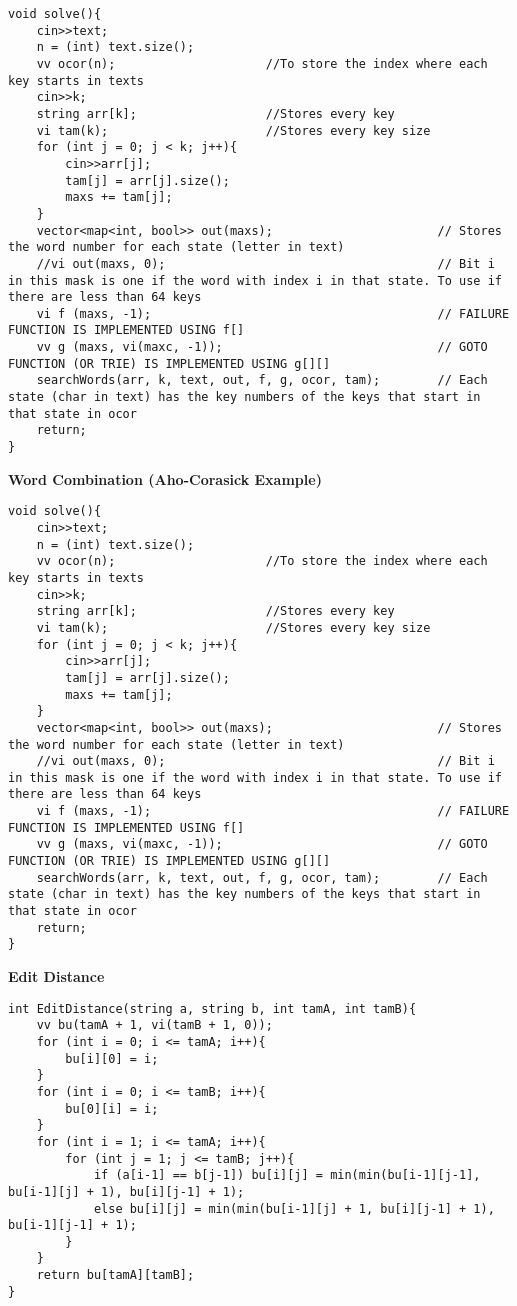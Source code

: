 \documentclass{article}
\begin{document}
\begin{multicols}{2}
\begin{lstlisting}
void solve(){
	cin>>text;
	n = (int) text.size();
	vv ocor(n);                     //To store the index where each key starts in texts
	cin>>k;
	string arr[k];                  //Stores every key
	vi tam(k);                      //Stores every key size
	for (int j = 0; j < k; j++){
		cin>>arr[j];
		tam[j] = arr[j].size();
		maxs += tam[j];
	}
	vector<map<int, bool>> out(maxs);                       // Stores the word number for each state (letter in text)
	//vi out(maxs, 0);                                      // Bit i in this mask is one if the word with index i in that state. To use if there are less than 64 keys
	vi f (maxs, -1);                                        // FAILURE FUNCTION IS IMPLEMENTED USING f[]
	vv g (maxs, vi(maxc, -1));                              // GOTO FUNCTION (OR TRIE) IS IMPLEMENTED USING g[][]
	searchWords(arr, k, text, out, f, g, ocor, tam);        // Each state (char in text) has the key numbers of the keys that start in that state in ocor  
	return;
}	
\end{lstlisting}

\large
\huge\textbf{Word Combination (Aho-Corasick Example)}
\large
\begin{lstlisting}
void solve(){
	cin>>text;
	n = (int) text.size();
	vv ocor(n);                     //To store the index where each key starts in texts
	cin>>k;
	string arr[k];                  //Stores every key
	vi tam(k);                      //Stores every key size
	for (int j = 0; j < k; j++){
		cin>>arr[j];
		tam[j] = arr[j].size();
		maxs += tam[j];
	}
	vector<map<int, bool>> out(maxs);                       // Stores the word number for each state (letter in text)
	//vi out(maxs, 0);                                      // Bit i in this mask is one if the word with index i in that state. To use if there are less than 64 keys
	vi f (maxs, -1);                                        // FAILURE FUNCTION IS IMPLEMENTED USING f[]
	vv g (maxs, vi(maxc, -1));                              // GOTO FUNCTION (OR TRIE) IS IMPLEMENTED USING g[][]
	searchWords(arr, k, text, out, f, g, ocor, tam);        // Each state (char in text) has the key numbers of the keys that start in that state in ocor  
	return;
}
\end{lstlisting}


\large
\huge\textbf{Edit Distance}
\large
\begin{lstlisting}
int EditDistance(string a, string b, int tamA, int tamB){
	vv bu(tamA + 1, vi(tamB + 1, 0));
	for (int i = 0; i <= tamA; i++){
		bu[i][0] = i;
	}
	for (int i = 0; i <= tamB; i++){
		bu[0][i] = i;
	}
	for (int i = 1; i <= tamA; i++){
		for (int j = 1; j <= tamB; j++){
			if (a[i-1] == b[j-1]) bu[i][j] = min(min(bu[i-1][j-1], bu[i-1][j] + 1), bu[i][j-1] + 1);
			else bu[i][j] = min(min(bu[i-1][j] + 1, bu[i][j-1] + 1), bu[i-1][j-1] + 1);
		}
	}
	return bu[tamA][tamB];
}	
\end{lstlisting}


\end{multicols}
\end{document}
